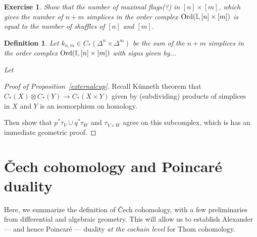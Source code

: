 \documentclass{amsart}          %
\newtheorem{definition}[theorem]{Definition}
\newtheorem{exercise}[theorem]{Exercise}
\newcommand{\I}{\mathbb I}
\begin{document}
\begin{exercise}
Show that the number of maximal flags(?) in $[n] \times [m]$, which gives the number of
$n + m$ simplices in the order complex ${\rm Ord}(\I, [n] \times [m])$ is equal to the number of shuffles of $[n]$ and $[m]$.
\end{exercise}

\begin{definition}
Let $k_{n,m} \in C_*(\Delta^n \times \Delta^m)$ be the sum of the $n + m$ simplices in the order complex ${\rm Ord}(\I, [n] \times [m])$
with signs given by...  

Let 
\end{definition}


\begin{proof}[Proof of Proposition~\ref{externalcup}]
Recall K\"unneth theorem that  $C_*(X) \otimes C_*(Y) \to C_*(X \times Y)$ given by (subdividing) products of simplices in $X$ and $Y$ is an
isomorphism on homology.  

Then show that $p^* \tau_V \cup q^* \tau_W$ and $\tau_{V \times W}$ agree on this subcomplex, which is has an immediate
geometric proof.
\end{proof}

\section{\v{C}ech cohomology and Poincar\'{e} duality}
Here, we summarize the definition of \v{C}ech cohomology, with a few preliminaries from differential and algebraic geometry. This will allow us to establish Alexander --- and hence Poincar\'{e} --- duality \textit{at the cochain level} for Thom cohomology.
\end{document}
